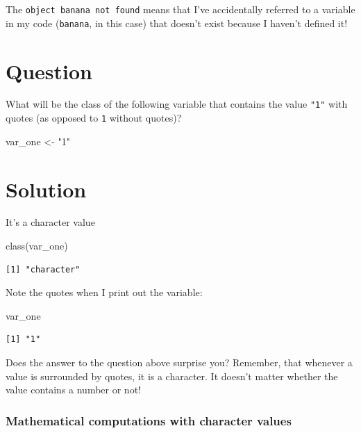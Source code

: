 \documentclass[
  letterpaper,
  DIV=11,
  numbers=noendperiod]{scrreprt}
\newenvironment{Shaded}{\begin{snugshade}}{\end{snugshade}}
\newcommand{\FunctionTok}[1]{\textcolor[rgb]{0.28,0.35,0.67}{#1}}
\newcommand{\NormalTok}[1]{\textcolor[rgb]{0.00,0.23,0.31}{#1}}
\newcommand{\OtherTok}[1]{\textcolor[rgb]{0.00,0.23,0.31}{#1}}
\newcommand{\StringTok}[1]{\textcolor[rgb]{0.13,0.47,0.30}{#1}}
\begin{document}
The
\texttt{object\ \textquotesingle{}banana\textquotesingle{}\ not\ found}
means that I've accidentally referred to a variable in my code
(\texttt{banana}, in this case) that doesn't exist because I haven't
defined it!

\section{Question}

What will be the class of the following variable that contains the value
\texttt{"1"} with quotes (as opposed to \texttt{1} without quotes)?

\begin{Shaded}
\begin{Highlighting}[]
\NormalTok{var\_one }\OtherTok{\textless{}{-}} \StringTok{"1"}
\end{Highlighting}
\end{Shaded}

\section{Solution}

It's a character value

\begin{Shaded}
\begin{Highlighting}[]
\FunctionTok{class}\NormalTok{(var\_one)}
\end{Highlighting}
\end{Shaded}

\begin{verbatim}
[1] "character"
\end{verbatim}

Note the quotes when I print out the variable:

\begin{Shaded}
\begin{Highlighting}[]
\NormalTok{var\_one}
\end{Highlighting}
\end{Shaded}

\begin{verbatim}
[1] "1"
\end{verbatim}

Does the answer to the question above surprise you? Remember, that
whenever a value is surrounded by quotes, it is a character. It doesn't
matter whether the value contains a number or not!

\subsubsection{Mathematical computations with character
values}\label{mathematical-computations-with-character-values}
\end{document}
